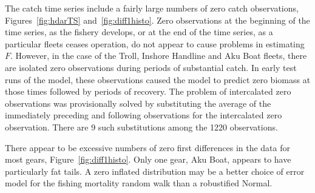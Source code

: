 \documentclass[12pt,letterpaper]{article}
\begin{document}
The catch time series include a fairly large numbers of zero catch
observations, Figures~\ref{fig:hdarTS} and~\ref{fig:diff1histo}.
Zero observations at the
beginning of the time series, as the fishery develops, or at the end of
the time series, as a particular fleets ceases operation, do not appear
to cause problems in estimating $F$.
However, in the case of the Troll, Inshore Handline and Aku Boat
fleets, there are isolated
zero observations during periods of substantial catch.
In early test runs of the model, these observations caused the model to predict
zero biomass at those times followed by periods of recovery. The
problem of intercalated zero observations
was provisionally solved by substituting the average of the immediately
preceding and following observations for the intercalated zero
observation. There are 9 such substitutions among the 1220
observations.

There appear to be excessive numbers of zero first differences
in the data for most gears, Figure~\ref{fig:diff1histo}. Only one
gear, Aku Boat, appears to have particularly fat tails. A zero
inflated distribution may be a better choice of error model for the
fishing mortality random walk than a robustified Normal.
\end{document}

